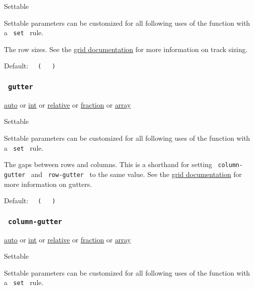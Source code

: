 {{ Settable }}

\label{parameters-rows-settable-tooltip}
Settable parameters can be customized for all following uses of the
function with a \texttt{\ set\ } rule.

The row sizes. See the \href{/docs/reference/layout/grid/}{grid
documentation} for more information on track sizing.

Default:
\texttt{\ }{\texttt{\ (\ }}\texttt{\ }{\texttt{\ )\ }}\texttt{\ }

\subsubsection{\texorpdfstring{\texttt{\ gutter\ }}{ gutter }}\label{parameters-gutter}

\href{/docs/reference/foundations/auto/}{auto} {or}
\href{/docs/reference/foundations/int/}{int} {or}
\href{/docs/reference/layout/relative/}{relative} {or}
\href{/docs/reference/layout/fraction/}{fraction} {or}
\href{/docs/reference/foundations/array/}{array}

{{ Settable }}

\label{parameters-gutter-settable-tooltip}
Settable parameters can be customized for all following uses of the
function with a \texttt{\ set\ } rule.

The gaps between rows and columns. This is a shorthand for setting
\texttt{\ column-gutter\ } and \texttt{\ row-gutter\ } to the same
value. See the \href{/docs/reference/layout/grid/}{grid documentation}
for more information on gutters.

Default:
\texttt{\ }{\texttt{\ (\ }}\texttt{\ }{\texttt{\ )\ }}\texttt{\ }

\subsubsection{\texorpdfstring{\texttt{\ column-gutter\ }}{ column-gutter }}\label{parameters-column-gutter}

\href{/docs/reference/foundations/auto/}{auto} {or}
\href{/docs/reference/foundations/int/}{int} {or}
\href{/docs/reference/layout/relative/}{relative} {or}
\href{/docs/reference/layout/fraction/}{fraction} {or}
\href{/docs/reference/foundations/array/}{array}

{{ Settable }}

\label{parameters-column-gutter-settable-tooltip}
Settable parameters can be customized for all following uses of the
function with a \texttt{\ set\ } rule.


